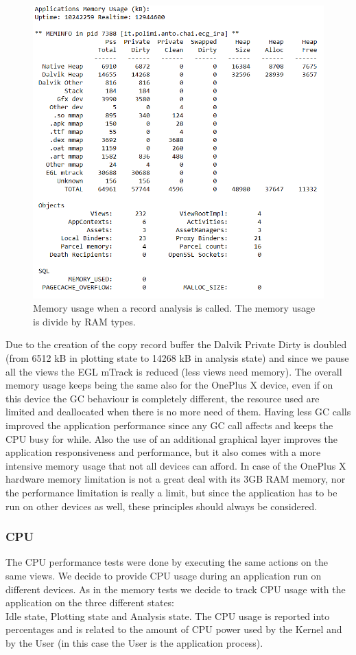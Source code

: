 \begin{figure}[ht]
	\centering	
	\includegraphics[width=0.6\linewidth]{figures/ch10/27.png}
	\caption{Memory usage when a record analysis is called. The memory usage is divide by RAM types.}  
	\label{fig10.27}
\end{figure}
\newpage
Due to the creation of the copy record buffer the Dalvik Private Dirty is doubled (from 6512 kB in plotting state to 14268 kB in analysis state) and since we pause all the views the EGL mTrack is reduced (less views need memory).
\newline
The overall memory usage keeps being the same also for the OnePlus X device, even if on this device the GC behaviour is completely different, the resource used are limited and deallocated when there is no more need of them. Having  less GC calls improved the application performance since any GC call affects and keeps the CPU busy for while. Also the use of an additional graphical layer improves the application responsiveness and performance, but it also comes with a more intensive memory usage that not all devices can afford. In case of the OnePlus X hardware memory limitation is not a great deal with its 3GB RAM memory, nor the performance limitation is really a limit, but since the application has to be run on other devices as well, these principles should always be considered.
\subsubsection{CPU}
The CPU performance tests were done by executing the same actions on the same views. We decide to provide CPU usage during an application run on different devices. As in the memory tests we decide to track CPU usage with the application on the three different states:\\
Idle state, Plotting state and Analysis state. The CPU usage is reported into percentages and is related to the amount of CPU power used by the Kernel and by the User (in this case the User is the application process).
